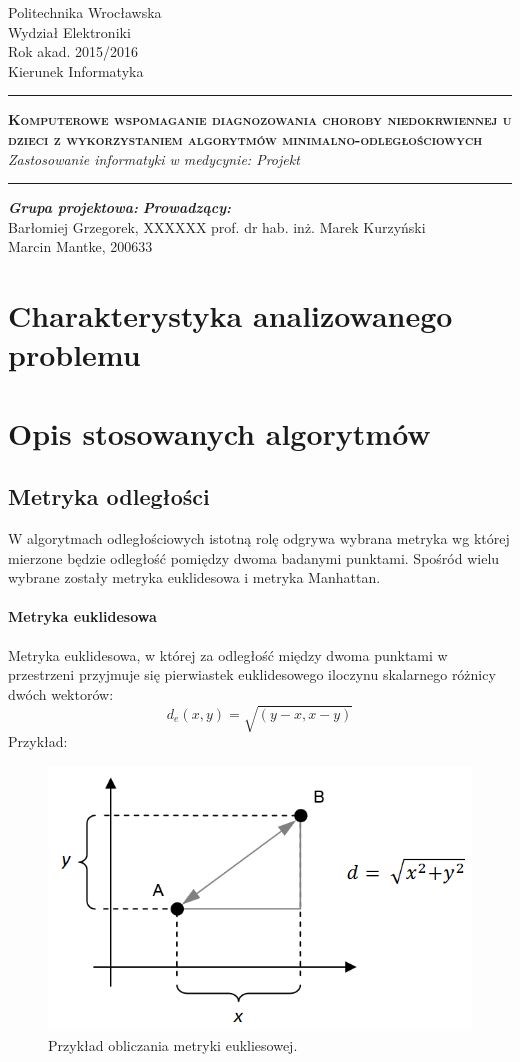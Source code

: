 \documentclass[11pt, a4paper, titlepage]{report}
\date{Wrocław, 06.06.2016}
\makeatletter
\renewcommand{\maketitle}{\begin{titlepage}
		\begin{center}\small
			Politechnika Wrocławska\\
			Wydział Elektroniki\\
			Rok akad. 2015/2016\\
			Kierunek Informatyka\\
			\vspace{3cm}
			\rule{\linewidth}{0.4pt}
				\huge \textsc{\textbf{Komputerowe wspomaganie diagnozowania choroby niedokrwiennej u dzieci z wykorzystaniem algorytmów minimalno-odległościowych}}
				\vspace{0.5cm} \\
				\normalsize \textit{Zastosowanie informatyki w medycynie: Projekt}
			\rule{\linewidth}{0.4pt}
		\end{center}

		\vspace{3cm}
		\begin{flushleft}
			\textbf{\textit{Grupa projektowa:}} \hspace{6.5cm} \textbf{\textit{Prowadzący:}} \\
			Barłomiej Grzegorek, XXXXXX \hfill{prof. dr hab. inż. Marek Kurzyński} \\
			Marcin Mantke, 200633\\
			\vspace{2cm}
		\end{flushleft}
		\vspace*{\stretch{6}}
		\begin{center}
			\@date
		\end{center}
	\end{titlepage}%
}
\makeatother
\begin{document}
\maketitle
\tableofcontents
\cleardoublepage
{}
{}
\listoffigures

\cleardoublepage
{}
{}
\lstlistoflistings
\chapter{Charakterystyka analizowanego problemu}
\label{chap:Charakterystyka analizowanego problemu}

\chapter{Opis stosowanych algorytmów}
\label{chap:Opis stosowanych algorytmów}
\section{Metryka odległości}
\label{sec:Metryka odległosci}
W algorytmach odległościowych istotną rolę odgrywa wybrana metryka wg której mierzone będzie odległość pomiędzy dwoma badanymi punktami. Spośród wielu wybrane zostały metryka euklidesowa i metryka Manhattan.
\subsubsection{Metryka euklidesowa}
\label{subs:Metryka euklidesowa}
Metryka euklidesowa, w której za odległość między dwoma punktami w przestrzeni przyjmuje się pierwiastek euklidesowego iloczynu skalarnego różnicy dwóch wektorów:
$$d_e(x,y) = \sqrt{(y-x, x-y)}$$
Przykład:
\begin{figure}[h]
  \centering
  \includegraphics[scale=0.5]{obrazki/euklides}
  \caption{Przykład obliczania metryki eukliesowej.}
\end{figure}
\end{document}
